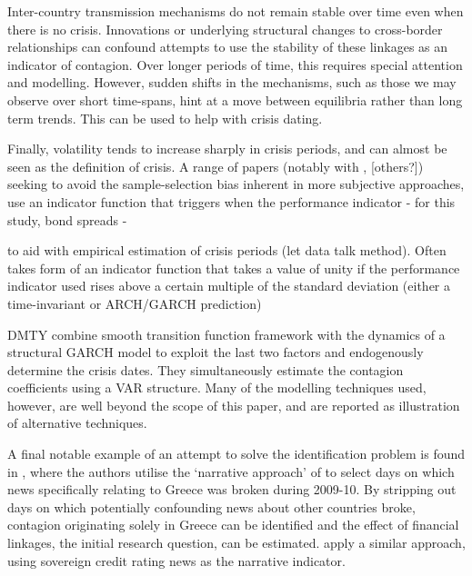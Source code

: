 \documentclass[../base.tex]{subfiles}
\begin{document}
Inter-country transmission mechanisms do not remain stable over time even when there is no crisis. Innovations or underlying structural changes to cross-border relationships can confound attempts to use the stability of these linkages as an indicator of contagion. Over longer periods of time, this requires special attention and modelling. However, sudden shifts in the mechanisms, such as those we may observe over short time-spans, hint at a move between equilibria rather than long term trends. This can be used to help with crisis dating.

Finally, volatility tends to increase sharply in crisis periods, and can almost be seen as the definition of crisis. A range of papers (notably with \cite{eichengreen1996contagious}, [others?]) seeking to avoid the sample-selection bias inherent in more subjective approaches, use an indicator function that triggers when the performance indicator - for this study, bond spreads - 

 to aid with empirical estimation of crisis periods (let data talk method). Often takes form of an indicator function that takes a value of unity if the performance indicator used rises above a certain multiple of the standard deviation (either a time-invariant or ARCH/GARCH prediction)

DMTY combine smooth transition function framework with the dynamics of a structural GARCH model to exploit the last two factors and endogenously determine the crisis dates. They simultaneously estimate the contagion coefficients using a VAR structure. Many of the modelling techniques used, however, are well beyond the scope of this paper, and are reported as illustration of alternative techniques.

A final notable example of an attempt to solve the identification problem is found in \cite{brutti2012transmission}, where the authors utilise the `narrative approach' of \cite{romer1989does} to select days on which news specifically relating to Greece was broken during 2009-10. By stripping out days on which potentially confounding news about other countries broke, contagion originating solely in Greece can be identified and the effect of financial linkages, the initial research question, can be estimated. \cite{arezki2011sovereign} apply a similar approach, using sovereign credit rating news as the narrative indicator. 


\end{document}
